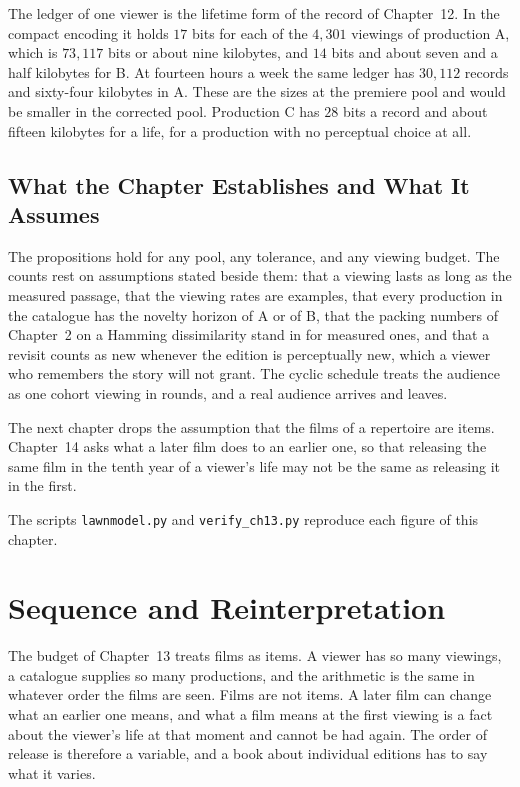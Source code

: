 \documentclass[11pt,twoside,openright]{book}
\theoremstyle{plain}
\theoremstyle{definition}
\theoremstyle{remark}
\begin{document}
The ledger of one viewer is the lifetime form of the record of Chapter~12. In the compact encoding it holds $17$ bits for each of the $4{,}301$ viewings of production A, which is $73{,}117$ bits or about nine kilobytes, and $14$ bits and about seven and a half kilobytes for B. At fourteen hours a week the same ledger has $30{,}112$ records and sixty-four kilobytes in A. These are the sizes at the premiere pool and would be smaller in the corrected pool. Production C has $28$ bits a record and about fifteen kilobytes for a life, for a production with no perceptual choice at all.

\section{What the Chapter Establishes and What It Assumes}\label{sec:limits13}

The propositions hold for any pool, any tolerance, and any viewing budget. The counts rest on assumptions stated beside them: that a viewing lasts as long as the measured passage, that the viewing rates are examples, that every production in the catalogue has the novelty horizon of A or of B, that the packing numbers of Chapter~2 on a Hamming dissimilarity stand in for measured ones, and that a revisit counts as new whenever the edition is perceptually new, which a viewer who remembers the story will not grant. The cyclic schedule treats the audience as one cohort viewing in rounds, and a real audience arrives and leaves.

The next chapter drops the assumption that the films of a repertoire are items. Chapter~14 asks what a later film does to an earlier one, so that releasing the same film in the tenth year of a viewer's life may not be the same as releasing it in the first.

The scripts \texttt{lawnmodel.py} and \texttt{verify\_ch13.py} reproduce each figure of this chapter.

\chapter{Sequence and Reinterpretation}
\label{ch:sequence}

The budget of Chapter~13 treats films as items. A viewer has so many viewings, a catalogue supplies so many productions, and the arithmetic is the same in whatever order the films are seen. Films are not items. A later film can change what an earlier one means, and what a film means at the first viewing is a fact about the viewer's life at that moment and cannot be had again. The order of release is therefore a variable, and a book about individual editions has to say what it varies.
\end{document}
